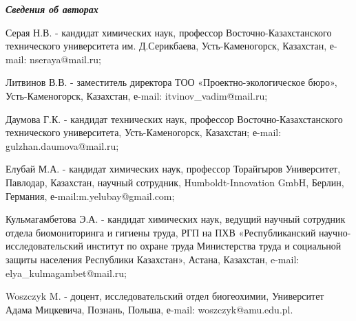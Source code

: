 \emph{{\bfseries Сведения об авторах}}

Серая Н.В. - кандидат химических наук, профессор Восточно-Казахстанского
технического университета им. Д.Серикбаева, Усть-Каменогорск, Казахстан,
е-mail: nseraya@mail.ru;

Литвинов В.В. - заместитель директора ТОО «Проектно-экологическое бюро»,
Усть-Каменогорск, Казахстан, е-mail:
itvinov\_vadim@mail.ru;

Даумова Г.К. - кандидат технических наук, профессор
Восточно-Казахстанского технического университета, Усть-Каменогорск,
Казахстан; е-mail:
gulzhan.daumova@mail.ru;

Елубай М.А. - кандидат химических наук, профессор Торайгыров
Университет, Павлодар, Казахстан, научный сотрудник, Humboldt-Innovation
GmbH, Берлин, Германия, е-mail:m.yelubay@gmail.com;

Кульмагамбетова Э.А. - кандидат химических наук, ведущий научный
сотрудник отдела биомониторинга и гигиены труда, РГП на ПХВ
«Республиканский научно-исследовательский институт по охране труда
Министерства труда и социальной защиты населения Республики Казахстан»,
Астана, Казахстан, e-mail:
elya\_kulmagambet@mail.ru;

Woszczyk M. - доцент, исследовательский отдел биогеохимии, Университет
Адама Мицкевича, Познань, Польша, е-mail:
woszczyk@amu.edu.pl.
